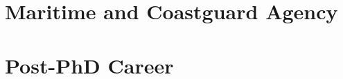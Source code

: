 
\section{\label{8:sec:MCA}Maritime and Coastguard Agency}






\section{\label{8:sec:post-phd}Post-PhD Career}



